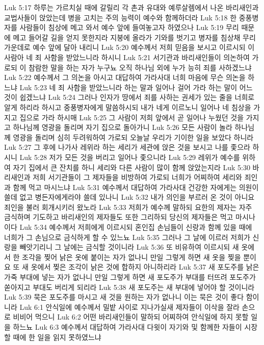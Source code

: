 Luk 5:17  하루는 가르치실 때에 갈릴리 각 촌과 유대와 예루살렘에서 나온 바리새인과 교법사들이 앉았는데 병을 고치는 주의 능력이 예수와 함께하더라
Luk 5:18  한 중풍병자를 사람들이 침상에 메고 와서 예수 앞에 들여놓고자 하였으나
Luk 5:19  무리 때문에 메고 들어갈 길을 얻지 못한지라 지붕에 올라가 기와를 벗기고 병자를 침상채 무리 가운데로 예수 앞에 달아 내리니
Luk 5:20  예수께서 저희 믿음을 보시고 이르시되 이 사람아 네 죄 사함을 받았느니라 하시니
Luk 5:21  서기관과 바리새인들이 의논하여 가로되 이 참람한 말을 하는 자가 누구뇨 오직 하나님 외에 누가 능히 죄를 사하겠느냐
Luk 5:22  예수께서 그 의논을 아시고 대답하여 가라사대 너희 마음에 무슨 의논을 하느냐
Luk 5:23  네 죄 사함을 받았느니라 하는 말과 일어나 걸어 가라 하는 말이 어느 것이 쉽겠느냐
Luk 5:24  그러나 인자가 땅에서 죄를 사하는 권세가 있는 줄을 너희로 알게 하리라 하시고 중풍병자에게 말씀하시되 내가 네게 이르노니 일어나 네 침상을 가지고 집으로 가라 하시매
Luk 5:25  그 사람이 저희 앞에서 곧 일어나 누웠던 것을 가지고 하나님께 영광을 돌리며 자기 집으로 돌아가니
Luk 5:26  모든 사람이 놀라 하나님께 영광을 돌리며 심히 두려워하여 가로되 오늘날 우리가 기이한 일을 보았다 하니라
Luk 5:27  그 후에 나가사 레위라 하는 세리가 세관에 앉은 것을 보시고 나를 좇으라 하시니
Luk 5:28  저가 모든 것을 버리고 일어나 좇으니라
Luk 5:29  레위가 예수를 위하여 자기 집에서 큰 잔치를 하니 세리와 다른 사람이 많이 함께 앉았는지라
Luk 5:30  바리새인과 저희 서기관들이 그 제자들을 비방하여 가로되 너희가 어찌하여 세리와 죄인과 함께 먹고 마시느냐
Luk 5:31  예수께서 대답하여 가라사대 건강한 자에게는 의원이 쓸데 없고 병든자에게라야 쓸데 있나니
Luk 5:32  내가 의인을 부르러 온 것이 아니요 죄인을 불러 회개시키러 왔노라
Luk 5:33  저희가 예수께 말하되 요한의 제자는 자주 금식하며 기도하고 바리새인의 제자들도 또한 그리하되 당신의 제자들은 먹고 마시나이다
Luk 5:34  예수께서 저희에게 이르시되 혼인집 손님들이 신랑과 함께 있을 때에 너희가 그 손님으로 금식하게 할 수 있느뇨
Luk 5:35  그러나 그 날에 이르러 저희가 신랑을 빼앗기리니 그 날에는 금식할 것이니라
Luk 5:36  또 비유하여 이르시되 새 옷에서 한 조각을 찢어 낡은 옷에 붙이는 자가 없나니 만일 그렇게 하면 새 옷을 찢을 뿐이요 또 새 옷에서 찢은 조각이 낡은 것에 합하지 아니하리라
Luk 5:37  새 포도주를 낡은 가죽 부대에 넣는 자가 없나니 만일 그렇게 하면 새 포도주가 부대를 터뜨려 포도주가 쏟아지고 부대도 버리게 되리라
Luk 5:38  새 포도주는 새 부대에 넣어야 할 것이니라
Luk 5:39  묵은 포도주를 마시고 새 것을 원하는 자가 없나니 이는 묵은 것이 좋다 함이니라
Luk 6:1  안식일에 예수께서 밀밭 사이로 지나가실새 제자들이 이삭을 잘라 손으로 비비어 먹으니
Luk 6:2  어떤 바리새인들이 말하되 어찌하여 안식일에 하지 못할 일을 하느뇨
Luk 6:3  예수께서 대답하여 가라사대 다윗이 자기와 및 함께한 자들이 시장할 때에 한 일을 읽지 못하였느냐
